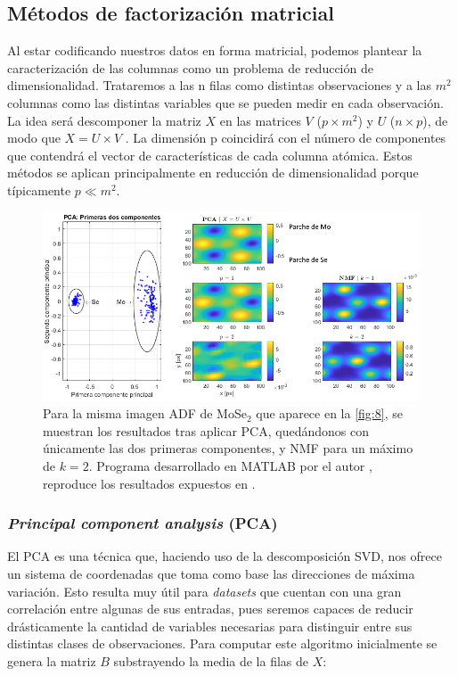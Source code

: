 \newpage
\subsection{Métodos de factorización matricial}

Al estar codificando nuestros datos en forma matricial, podemos plantear la caracterización de las columnas como un problema de reducción de dimensionalidad. Trataremos a las n filas como distintas observaciones y a las $m^2$ columnas como las distintas variables que se pueden medir en cada observación.\\

La idea será descomponer la matriz $X$ en las matrices $V$ ($p \times m^2$) y $U$ ($n \times p$), de modo que $X = U \times V$ \cite{EELS_PCA}. La dimensión p coincidirá con el número de componentes que contendrá el vector de características de cada columna atómica. Estos métodos se aplican principalmente en reducción de dimensionalidad porque típicamente $p \ll m^2$.

\begin{figure}[h!]
    \centering
    \includegraphics[width=1\textwidth]{fig/Fig9.png}
    \caption{Para la misma imagen ADF de MoSe$_2$ que aparece en la \autoref{fig:8}, se muestran los resultados tras aplicar PCA, quedándonos con únicamente las dos primeras componentes, y NMF para un máximo de $k = 2$. Programa desarrollado en MATLAB por el autor \cite{repo}, reproduce los resultados expuestos en \cite{ml}.}
    \label{fig:9}
\end{figure}

\vspace{-0.5cm}
\subsubsection{\textit{Principal component analysis} (PCA)}
El PCA es una técnica que, haciendo uso de la descomposición SVD, nos ofrece un sistema de coordenadas que toma como base las direcciones de máxima variación. Esto resulta muy útil para \textit{datasets} que cuentan con una gran correlación entre algunas de sus entradas, pues seremos capaces de reducir drásticamente la cantidad de variables necesarias para distinguir entre sus distintas clases de observaciones. Para computar este algoritmo inicialmente se genera la matriz $B$ substrayendo la media de la filas de $X$:

